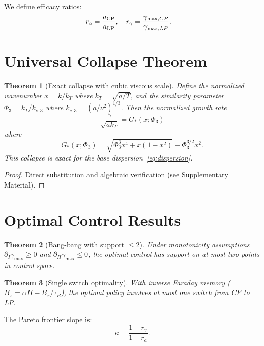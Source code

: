 \documentclass[aps,pre,twocolumn,showpacs,superscriptaddress]{revtex4-2}
\newtheorem{theorem}{Theorem}
\theoremstyle{definition}
\begin{document}
We define efficacy ratios:
\begin{align}
r_a &= \frac{a_{\rm CP}}{a_{\rm LP}}, \quad r_\gamma = \frac{\gamma_{\max,CP}}{\gamma_{\max,LP}}.
\end{align}

\section{Universal Collapse Theorem}\label{sec:collapse}

\begin{theorem}[Exact collapse with cubic viscous scale]\label{thm:exact-collapse}
Define the normalized wavenumber $x = k/k_T$ where $k_T = \sqrt{a/T}$, and the similarity parameter $\Phi_3 = k_T/k_{\nu,3}$ where $k_{\nu,3} = (a/\nu^2)^{1/3}$. Then the normalized growth rate
\begin{equation}
\frac{\gamma}{\sqrt{ak_T}} = G_*(x;\Phi_3)
\end{equation}
where
\begin{equation}
G_*(x;\Phi_3) = \sqrt{\Phi_3^3 x^4 + x(1-x^2)} - \Phi_3^{3/2} x^2.
\end{equation}
This collapse is exact for the base dispersion~\eqref{eq:dispersion}.
\end{theorem}

\begin{proof}
Direct substitution and algebraic verification (see Supplementary Material).
\end{proof}

\section{Optimal Control Results}\label{sec:control}

\begin{theorem}[Bang-bang with support $\leq 2$]\label{thm:bb-existence}
Under monotonicity assumptions $\partial_I\gamma_{\max} \geq 0$ and $\partial_\Pi\gamma_{\max} \leq 0$, the optimal control has support on at most two points in control space.
\end{theorem}

\begin{theorem}[Single switch optimality]\label{thm:oneswitch-PMP}
With inverse Faraday memory ($\dot{B}_x = \alpha\Pi - B_x/\tau_B$), the optimal policy involves at most one switch from CP to LP.
\end{theorem}

The Pareto frontier slope is:
\begin{equation}
\kappa = \frac{1-r_\gamma}{1-r_a}. \label{eq:pareto}
\end{equation}
\end{document}
